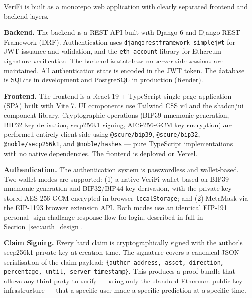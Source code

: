 \documentclass[a4paper,12pt]{report}
\begin{document}
VeriFi is built as a monorepo web application with clearly separated frontend and backend layers.

\begin{sloppypar}
\textbf{Backend.} The backend is a REST API built with Django 6 and Django REST Framework (DRF). Authentication uses \texttt{djangorestframework-simplejwt} for JWT issuance and validation, and the \texttt{eth-account} library for Ethereum signature verification. The backend is stateless: no server-side sessions are maintained. All authentication state is encoded in the JWT token. The database is SQLite in development and PostgreSQL in production (Render).
\end{sloppypar}

\textbf{Frontend.} The frontend is a React 19 + TypeScript single-page application (SPA) built with Vite 7. UI components use Tailwind CSS v4 and the shadcn/ui component library. Cryptographic operations (BIP39 mnemonic generation, BIP32 key derivation, secp256k1 signing, AES-256-GCM key encryption) are performed entirely client-side using \texttt{@scure/bip39}, \texttt{@scure/bip32}, \texttt{@noble/secp256k1}, and \texttt{@noble/hashes} --- pure TypeScript implementations with no native dependencies. The frontend is deployed on Vercel.

\textbf{Authentication.} The authentication system is passwordless and wallet-based. Two wallet modes are supported: (1) a native VeriFi wallet based on BIP39 mnemonic generation and BIP32/BIP44 key derivation, with the private key stored AES-256-GCM encrypted in browser \texttt{localStorage}; and (2) MetaMask via the EIP-1193 browser extension API. Both modes use an identical EIP-191 personal\_sign challenge-response flow for login, described in full in Section~\ref{sec:auth_design}.

\textbf{Claim Signing.} Every hard claim is cryptographically signed with the author's secp256k1 private key at creation time. The signature covers a canonical JSON serialisation of the claim payload: \texttt{\{author\_address, asset, direction, percentage, until, server\_timestamp\}}. This produces a proof bundle that allows any third party to verify --- using only the standard Ethereum public-key infrastructure --- that a specific user made a specific prediction at a specific time.
\end{document}
